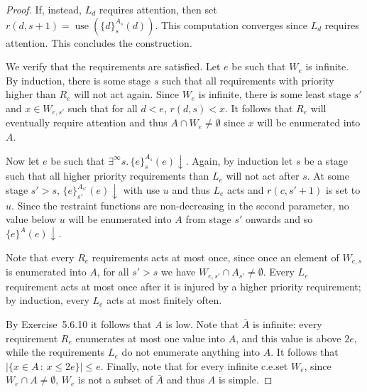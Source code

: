\documentclass{article}
\newcommand{\set}[1]{\{ #1 \}}
\newcommand{\compr}[2]{\{ #1 \,:\, #2 \}}
\newcommand{\terminates}{\!\!\downarrow}
\DeclareMathOperator{\use}{use}
\begin{document}
\begin{proof}
    If, instead, $L_d$ requires attention, then set $r(d, s+1) = \use(\set{d}^{A_s}_s(d))$.  This computation converges
    since $L_d$ requires attention.  This concludes the construction.

    We verify that the requirements are satisfied.  Let $e$ be such that $W_e$ is infinite.  By induction, there is some
    stage $s$ such that all requirements with priority higher than $R_e$ will not act again.  Since $W_e$ is infinite,
    there is some least stage $s'$ and $x \in W_{e,s'}$ such that for all $d < e$, $r(d, s) < x$.  It follows that $R_e$
    will eventually require attention and thus $A \cap W_e \neq \emptyset$ since $x$ will be enumerated into $A$.

    Now let $e$ be such that $\exists^\infty s.\, \set{e}^{A_s}_s(e)\terminates$.  Again, by induction let $s$ be a
    stage such that all higher priority requirements than $L_e$ will not act after $s$.  At some stage $s' > s$,
    $\set{e}^{A_{s'}}_{s'}(e)\terminates$ with use $u$ and thus $L_e$ acts and $r(c, s'+1)$ is set to $u$.  Since the
    restraint functions are non-decreasing in the second parameter, no value below $u$ will be enumerated into $A$ from
    stage $s'$ onwards and so $\set{e}^{A}(e)\terminates$.

    Note that every $R_e$ requirements acts at most once, since once an element of $W_{e,s}$ is enumerated into $A$, for
    all $s' > s$ we have $W_{e,s'} \cap A_{s'} \neq \emptyset$.  Every $L_e$ requirement acts at most once after it is
    injured by a higher priority requirement; by induction, every $L_e$ acts at most finitely often.

    By Exercise~5.6.10 it follows that $A$ is low.  Note that $\bar{A}$ is infinite: every requirement $R_e$ enumerates
    at most one value into $A$, and this value is above $2e$, while the requirements $L_e$ do not enumerate anything
    into $A$.  It follows that $|\compr{x \in A}{x \le 2e}| \le e$.  Finally, note that for every infinite c.e.\@ set
    $W_e$, since $W_e \cap A \neq \emptyset$, $W_e$ is not a subset of $\bar{A}$ and thus $A$ is simple.
  \end{proof}
\end{document}
